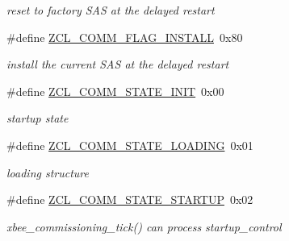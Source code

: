 \begin{DoxyCompactItemize}
\begin{DoxyCompactList}\small\item\em reset to factory S\+AS at the delayed restart \end{DoxyCompactList}\item 
\mbox{\label{group__zcl__commissioning_gaf041a27755c9719134f8a2ad59f124e3}} 
\#define \hyperlink{group__zcl__commissioning_gaf041a27755c9719134f8a2ad59f124e3}{Z\+C\+L\+\_\+\+C\+O\+M\+M\+\_\+\+F\+L\+A\+G\+\_\+\+I\+N\+S\+T\+A\+LL}~0x80
\begin{DoxyCompactList}\small\item\em install the current S\+AS at the delayed restart \end{DoxyCompactList}\item 
\mbox{\label{group__zcl__commissioning_gabf17d49005afcefa60714a10c1c54c74}} 
\#define \hyperlink{group__zcl__commissioning_gabf17d49005afcefa60714a10c1c54c74}{Z\+C\+L\+\_\+\+C\+O\+M\+M\+\_\+\+S\+T\+A\+T\+E\+\_\+\+I\+N\+IT}~0x00
\begin{DoxyCompactList}\small\item\em startup state \end{DoxyCompactList}\item 
\mbox{\label{group__zcl__commissioning_ga44abce1dcc61c33053dffe8641e4b167}} 
\#define \hyperlink{group__zcl__commissioning_ga44abce1dcc61c33053dffe8641e4b167}{Z\+C\+L\+\_\+\+C\+O\+M\+M\+\_\+\+S\+T\+A\+T\+E\+\_\+\+L\+O\+A\+D\+I\+NG}~0x01
\begin{DoxyCompactList}\small\item\em loading structure \end{DoxyCompactList}\item 
\mbox{\label{group__zcl__commissioning_ga03c5eb470ac12387be9e3e48953750f5}} 
\#define \hyperlink{group__zcl__commissioning_ga03c5eb470ac12387be9e3e48953750f5}{Z\+C\+L\+\_\+\+C\+O\+M\+M\+\_\+\+S\+T\+A\+T\+E\+\_\+\+S\+T\+A\+R\+T\+UP}~0x02
\begin{DoxyCompactList}\small\item\em xbee\+\_\+commissioning\+\_\+tick() can process startup\+\_\+control \end{DoxyCompactList}\item 
\mbox{\label{group__zcl__commissioning_ga60e0581b929ae09262680136205a2516}} 

\end{DoxyCompactItemize}
